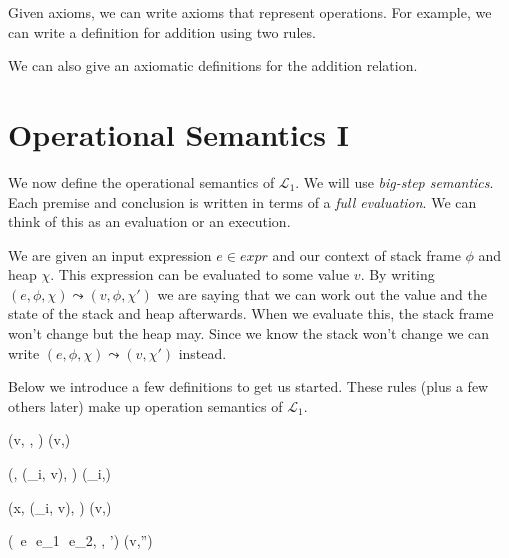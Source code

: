 Given axioms, we can write axioms that represent operations.
For example, we can write a definition for addition using two rules.

{}

{}


 
We can also give an axiomatic definitions for the addition relation.



\section{Operational Semantics I}

We now define the operational semantics of $\mathcal{L}_1$.
We will use \textit{big-step semantics}.
Each premise and conclusion is written in terms 
of a \textit{full evaluation}. 
We can think of this as an evaluation or an execution.


We are given an input expression $e \in expr$ and our context
of stack frame $\phi$ and heap $\chi$. This expression can 
be evaluated to some value $v$. 
By writing $(e, \phi, \chi) \leadsto (v,\phi, \chi')$ we are 
saying that we can work out the value and 
the state of the stack and heap afterwards. 
When we evaluate this, 
the stack frame won't change but the heap may.
Since we know the stack won't change we can write 
$(e, \phi, \chi) \leadsto (v, \chi')$ instead.


Below we introduce a few definitions to get us started. 
These rules (plus a few others later) make up operation semantics of 
$\mathcal{L}_1$.

{(v, \phi, \chi) \leadsto (v,\chi) }

{(, (\iota_i, v), \chi) \leadsto (\iota_i,\chi) }

{(x, (\iota_i, v), \chi) \leadsto (v,\chi) }

{( \,e\,  \,e_1\,  \,e_2, \phi, \chi') 
\leadsto (v,\chi'') }

